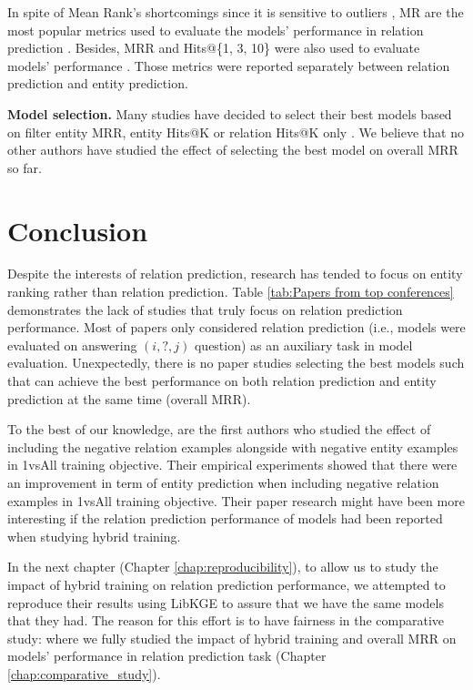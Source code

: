 In spite of Mean Rank's shortcomings since it is sensitive to outliers \citep{nickel2016holographic}, MR are the most popular metrics used to evaluate the models' performance in relation prediction \citep{cui2021type, Xie_Liu_Jia_Luan_Sun_2016, xie2016representation, lin2015modeling, shi2017proje, guan2018shared, yao2019kg}. Besides, MRR and Hits@\{1, 3, 10\} were also used to evaluate models' performance \citep{chang2020benchmark, chen2021relation}. Those metrics were reported separately between relation prediction and entity prediction.
\newline

\noindent\textbf{Model selection.} Many studies have decided to select their best models based on filter entity MRR, entity Hits@K \citep{Xie_Liu_Jia_Luan_Sun_2016, xie2016representation, lin2015modeling, shi2017proje, guan2018shared, yao2019kg}  or relation Hits@K only \citep{cui2021type}. We believe that no other authors have studied the effect of selecting the best model on overall MRR so far.  

\section{Conclusion}

Despite the interests of relation prediction, research has tended to focus on entity ranking rather than relation prediction. Table \ref{tab:Papers from top conferences} demonstrates the lack of studies that truly focus on relation prediction performance. Most of papers only considered relation prediction (i.e., models were evaluated on answering $(i,?,j)$ question) as an auxiliary task in model evaluation. Unexpectedly, there is no paper studies selecting the best models such that can achieve the best performance on both relation prediction and entity prediction at the same time (overall MRR). 

To the best of our knowledge, \citet{chen2021relation} are the first authors who studied the effect of including the negative relation examples alongside with negative entity examples in 1vsAll training objective. Their empirical experiments showed that there were an improvement in term of entity prediction when including negative relation examples in 1vsAll training objective. Their paper research might have been more interesting if the relation prediction performance of models had been reported when studying hybrid training.

In the next chapter (Chapter \ref{chap:reproducibility}), to allow us to study the impact of hybrid training on relation prediction performance, we attempted to reproduce their results using LibKGE \citep{libkge} to assure that we have the same models that they had. The reason for this effort is to have fairness in the comparative study: where we fully studied the impact of hybrid training and overall MRR on models' performance in relation prediction task (Chapter \ref{chap:comparative_study}). 

